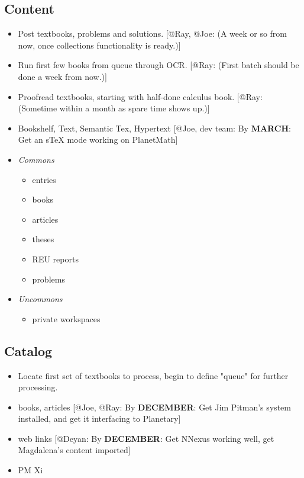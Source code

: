 \subsection*{Content}
\begin{itemize}
\item Post textbooks, problems and solutions.  [@Ray, @Joe: (A week or so from
now, once collections functionality is ready.)]
\item Run first few books from queue through OCR. [@Ray: (First batch should be done a week from now.)]
\item Proofread textbooks, starting with half-done calculus book.
[@Ray: (Sometime within a month as spare time shows up.)]
\item Bookshelf, Text, Semantic Tex, Hypertext [@Joe, dev team: By {\bf MARCH}: Get
   an sTeX mode working on PlanetMath]
\item \emph{Commons}
  \begin{itemize}
  \item entries
  \item books
  \item articles
  \item theses
  \item REU reports
  \item problems
  \end{itemize}
\item \emph{Uncommons}
  \begin{itemize}
  \item private workspaces
  \end{itemize}
\end{itemize}

\subsection*{Catalog}
\begin{itemize}
\item Locate first set of textbooks to process, begin to define
  "queue" for further processing.
\item books, articles [@Joe, @Ray: By {\bf DECEMBER}: Get Jim Pitman's system
   installed, and get it interfacing to Planetary]
\item web links [@Deyan: By {\bf DECEMBER}: Get NNexus working well, get
   Magdalena's content imported]
\item PM Xi
\end{itemize}

